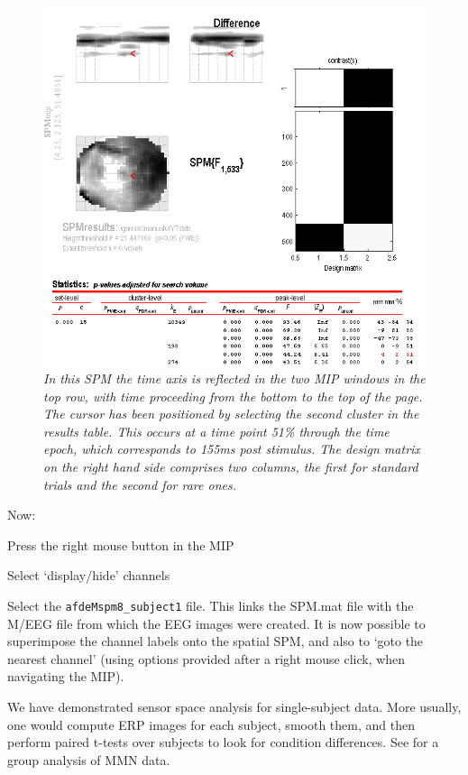  \begin{figure}
\begin{center}
\includegraphics[width=120mm]{mmn/3DSPM}
\caption{\em In this SPM the time axis is reflected in the two MIP windows in the top row, with time proceeding from the bottom to the top of the page. The cursor has been positioned by selecting the second cluster in the results table. This occurs at a time point 51\% through the time epoch, which corresponds to 155ms post stimulus. The design matrix on the right hand side comprises two columns, the first for standard trials and the second for rare ones. \label{3DSPM}}
\end{center}
\end{figure}
 Now:
 \bi
 \item{Press the right mouse button in the MIP}
  \item{Select `display/hide' channels}
\item{Select the \texttt{afdeMspm8\_subject1} file.}
 \ei
 This links the SPM.mat file with the M/EEG file from which the EEG images were created.
 It is now possible to superimpose the channel labels onto the spatial SPM, and also to `goto the nearest channel' (using options provided after a right mouse click, when navigating the MIP).
 
 We have demonstrated sensor space analysis for single-subject data. More usually, one would compute ERP images for each subject, smooth them, and then perform paired t-tests over subjects to look for condition differences. See \cite{marta_mmndcm} for a group analysis of MMN data.
 
